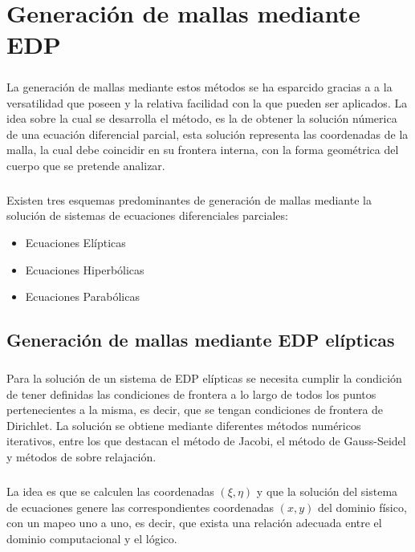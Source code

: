 \documentclass[letterpaper, openright, 12pt]{book}
\begin{document}
%
%
%
%
%

%
%
%
%
%
\chapter{Generación de mallas mediante EDP}
	\paragraph*{}
	La generación de mallas mediante estos métodos se ha esparcido gracias a a la versatilidad que poseen y la relativa facilidad con la que pueden ser aplicados. La idea sobre la cual se desarrolla el método, es la de obtener la solución númerica de una ecuación diferencial parcial, esta solución representa las coordenadas de la malla, la cual debe coincidir en su frontera interna, con la forma geométrica del cuerpo que se pretende analizar.\cite{siladic-grid-generation}
		
	\paragraph*{}
	Existen tres esquemas predominantes de generación de mallas mediante la solución de sistemas de ecuaciones diferenciales parciales:
	\begin{itemize}
		\item Ecuaciones Elípticas
		\item Ecuaciones Hiperbólicas
		\item Ecuaciones Parabólicas
	\end{itemize}
		
	\section{Generación de mallas mediante EDP elípticas}
		\paragraph*{}
			Para la solución de un sistema de EDP elípticas se necesita cumplir la condición de tener definidas las condiciones de frontera a lo largo de todos los puntos pertenecientes a la misma, es decir, que se tengan condiciones de frontera de Dirichlet.
			La solución se obtiene mediante diferentes métodos numéricos iterativos, entre los que destacan el método de Jacobi, el método de Gauss-Seidel y métodos de sobre relajación.
			
		\paragraph*{}
			La idea es que se calculen las coordenadas $(\xi, \eta)$ y que la solución del sistema de ecuaciones genere las correspondientes coordenadas $(x, y)$ del dominio físico, con un mapeo uno a uno, es decir, que exista una relación adecuada entre el dominio computacional y el lógico.
			
\end{document}
